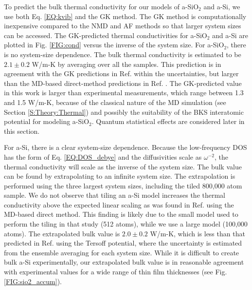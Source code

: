 \documentclass[aps,prb,twocolumn,superscriptaddress,footinbib,amsmath,amssymb,floatfix]{revtex4}
\begin{document}
To predict the bulk thermal conductivity for our models of a-SiO$_2$ and 
a-Si, we use both Eq. \eqref{EQ:kvib} 
and the GK method. The GK method is computationally 
inexpensive compared to the NMD and AF methods so that 
larger system sizes can be accessed.  
The GK-predicted thermal conductivities for a-SiO$_2$ and a-Si 
are plotted in Fig. \ref{FIG:cond} versus the inverse of the system 
size. For a-SiO$_2$, there is no system-size dependence.  
The bulk thermal conductivity is estimated to be 
$2.1 \pm 0.2$ W/m-K by averaging over all the samples. This prediction 
is in agreement with the GK predictions in Ref. 
 within the uncertainties, 
but larger than the MD-based direct-method predictions in Ref. 
. 
The GK-predicted value in this work is larger than experimental 
measurements, which range between 
1.3 and 1.5 W/m-K,
\cite{cahill_lattice_1988,lee_heat_1997,
yamane_measurement_2002,regner_broadband_2013} 
because of the classical 
nature of the MD simulation (see Section \ref{S:Theory:Thermal}) 
and possibly the suitability of the BKS interatomic potential 
for modeling a-SiO$_2$.
\cite{jund_molecular-dynamics_1999,mcgaughey_thermal_2004}
Quantum statistical effects are considered later in this section. 

For a-Si, there is a clear system-size dependence. 
Because the low-frequency DOS has the form of Eq. \eqref{EQ:DOS_debye} 
and the diffusivities scale as $\omega^{-2}$,  
the thermal conductivity will scale as the inverse of the system size. 
The bulk value can be found by extrapolating to an infinite system size.
\cite{shiomi_thermal_2011,esfarjani_heat_2011,larkin_comparison_2012} 
The extrapolation is performed using the three largest 
system sizes, including the tiled 800,000 atom sample.  
We do not observe that tiling an a-Si model increases 
the thermal conductivity above the expected linear scaling as 
was found in Ref.  using the MD-based 
direct method. This finding is likely due to the 
small model used to perform the tiling in that study (512 atoms),  
while we use a large model (100,000 atoms). 
The extrapolated bulk value is $2.0 \pm 0.2$ W/m-K, which 
is less than that predicted in Ref.  
using the Tersoff potential, where the uncertainty is 
estimated from the ensemble averaging for each system size. 
While it is difficult to create 
bulk a-Si experimentally,\cite{vacher_attenuation_1980} 
our extrapolated bulk value 
is in reasonable agreement with experimental values for a wide 
range of thin film thicknesses (see Fig. \ref{FIG:sio2_accum}). 
\end{document}
